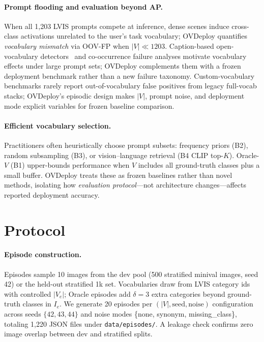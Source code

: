 \documentclass[10pt,twocolumn,letterpaper]{article}
\begin{document}
\paragraph{Prompt flooding and evaluation beyond AP.}
When all 1,203 LVIS prompts compete at inference, dense scenes induce cross-class activations unrelated to the user's task vocabulary; OVDeploy quantifies \emph{vocabulary mismatch} via OOV-FP when $|V| \ll 1203$.
Caption-based open-vocabulary detectors~\cite{zareian2021ovd} and co-occurrence failure analyses motivate vocabulary effects under large prompt sets; OVDeploy complements them with a frozen deployment benchmark rather than a new failure taxonomy.
Custom-vocabulary benchmarks rarely report out-of-vocabulary false positives from legacy full-vocab stacks; OVDeploy's episodic design makes $|V|$, prompt noise, and deployment mode explicit variables for frozen baseline comparison.

\paragraph{Efficient vocabulary selection.}
Practitioners often heuristically choose prompt subsets: frequency priors (B2), random subsampling (B3), or vision--language retrieval (B4 CLIP top-$K$).
Oracle-$V$ (B1) upper-bounds performance when $V$ includes all ground-truth classes plus a small buffer.
OVDeploy treats these as frozen baselines rather than novel methods, isolating how \emph{evaluation protocol}---not architecture changes---affects reported deployment accuracy.

\section{Protocol}
\label{sec:protocol}

\paragraph{Episode construction.}
Episodes sample 10 images from the dev pool (500 stratified minival images, seed 42) or the held-out stratified 1k set.
Vocabularies draw from LVIS category ids with controlled $|V_e|$; Oracle episodes add $\delta{=}3$ extra categories beyond ground-truth classes in $I_e$.
We generate 20 episodes per $(|V|, \text{seed}, \text{noise})$ configuration across seeds $\{42,43,44\}$ and noise modes \{none, synonym, missing\_class\}, totaling 1,220 JSON files under \texttt{data/episodes/}.
A leakage check confirms zero image overlap between dev and stratified splits.
\end{document}
